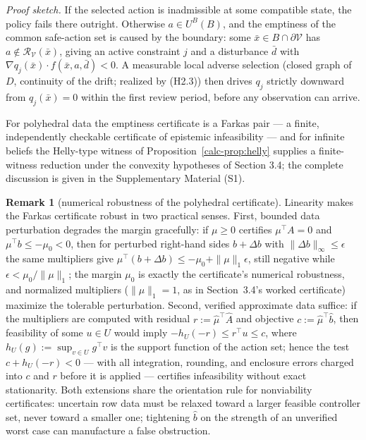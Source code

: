 \documentclass[10pt,twocolumn]{article}
\theoremstyle{definition}
\newtheorem{remark}{Remark}
\begin{document}
\emph{Proof sketch.} If the selected action is inadmissible at some compatible state, the policy fails there outright. Otherwise \(a \in U^B(B)\), and the emptiness of the common safe-action set is caused by the boundary: some \(\bar x \in B \cap \partial\mathcal{V}\) has \(a \notin \mathcal{R}_{\mathcal{V}}(\bar x)\), giving an active constraint \(j\) and a disturbance \(\bar d\) with \(\nabla q_j(\bar x) \cdot f(\bar x, a, \bar d) < 0\). A measurable local adverse selection (closed graph of \(D\), continuity of the drift; realized by (H2.3)) then drives \(q_j\) strictly downward from \(q_j(\bar x) = 0\) within the first review period, before any observation can arrive.

For polyhedral data the emptiness certificate is a Farkas pair --- a finite, independently checkable certificate of epistemic infeasibility --- and for infinite beliefs the Helly-type witness of Proposition~\ref{calc-prop:helly} supplies a finite-witness reduction under the convexity hypotheses of Section 3.4; the complete discussion is given in the Supplementary Material (S1).

\begin{remark}[numerical robustness of the polyhedral certificate]\label{calc-rem:robust-farkas}
Linearity makes the Farkas certificate robust in two practical senses. First,
bounded data perturbation degrades the margin gracefully: if
\(\mu \ge 0\) certifies \(\mu^{\top} A = 0\) and \(\mu^{\top} b \le -\mu_0 < 0\),
then for perturbed right-hand sides \(b + \Delta b\) with
\(\|\Delta b\|_\infty \le \epsilon\) the same multipliers give
\(\mu^{\top}(b + \Delta b) \le -\mu_0 + \|\mu\|_1 \epsilon\), still negative
while \(\epsilon < \mu_0/\|\mu\|_1\); the margin \(\mu_0\) is exactly the
certificate's numerical robustness, and normalized multipliers
(\(\|\mu\|_1 = 1\), as in Section~3.4's worked certificate) maximize the
tolerable perturbation. Second, verified approximate data suffice: if the
multipliers are computed with residual \(r := \hat\mu^{\top} \hat A\) and
objective \(c := \hat\mu^{\top} \hat b\), then feasibility of some
\(u \in U\) would imply \(-h_U(-r) \le r^{\top} u \le c\), where
\(h_U(g) := \sup_{v \in U} g^{\top} v\) is the support function of the action
set; hence the test \(c + h_U(-r) < 0\) --- with all integration, rounding,
and enclosure errors charged into \(c\) and \(r\) before it is applied ---
certifies infeasibility without exact stationarity. Both extensions share the
orientation rule for nonviability certificates: uncertain row data must be
relaxed toward a larger feasible controller set, never toward a smaller one;
tightening \(\hat b\) on the strength of an unverified worst case can
manufacture a false obstruction.
\end{remark}
\end{document}

